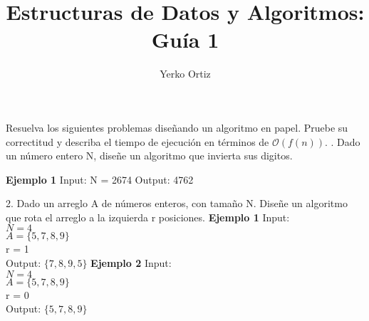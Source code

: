 \documentclass[12pt]{article}
\begin{document}
\title{Estructuras de Datos y Algoritmos: Guía 1}
\author{Yerko Ortiz}
\date{}

\maketitle
\flushleft
\justifying

Resuelva los siguientes problemas diseñando un algoritmo en papel. Pruebe su correctitud y describa el tiempo de ejecución en términos de $\mathcal{O}(f(n))$.
. 
\newline
Dado un número entero N, diseñe un algoritmo que invierta sus digitos. 
\newline

\textbf{Ejemplo 1} \newline
Input: N = 2674
\newline
Output: 4762 
\newline

2. 
\newline 
Dado un arreglo A de números enteros, con tamaño N. Diseñe un algoritmo que rota el arreglo a la izquierda r posiciones. 
\newline
\newline
\textbf{Ejemplo 1} 
\newline 
Input: \\ $N = 4$ \\ $A = \{ 5, 7, 8, 9 \}$ \\ r = 1 \\ 
Output: $\{7, 8, 9, 5 \}$
\newline
\newline
\textbf{Ejemplo 2} 
\newline 
Input: \\ $N = 4$ \\ $A = \{ 5, 7, 8, 9 \}$ \\ r = 0 \\ 
Output: $\{5, 7, 8, 9\}$
\end{document}
